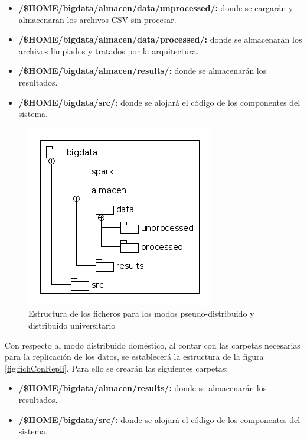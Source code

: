 \begin{itemize}
\item \textbf{/\$HOME/bigdata/almacen/data/unprocessed/:} donde se cargarán y almacenaran los archivos \gls{CSV} sin procesar.
\item \textbf{/\$HOME/bigdata/almacen/data/processed/:} donde se almacenarán los archivos limpiados y tratados por la arquitectura.
\item \textbf{/\$HOME/bigdata/almacen/results/:} donde se almacenarán los resultados.
\item \textbf{/\$HOME/bigdata/src/:} donde se alojará el código de los componentes del sistema.
\end{itemize}

\begin{figure}[htp!]
\centering
\caption{Estructura de los ficheros para los modos pseudo-distribuido y distribuido universitario}
\label{fig:fichSinRepli}
\includegraphics[scale=0.7]{diagramas/fichSinRepli}
\end{figure}

Con respecto al modo distribuido doméstico, al contar con las carpetas necesarias para la replicación de los datos, se establecerá la estructura de la figura \ref{fig:fichConRepli}. Para ello se crearán las siguientes carpetas:

\begin{itemize}
\item \textbf{/\$HOME/bigdata/almacen/results/:} donde se almacenarán los resultados.
\item \textbf{/\$HOME/bigdata/src/:} donde se alojará el código de los componentes del sistema.
\end{itemize}

